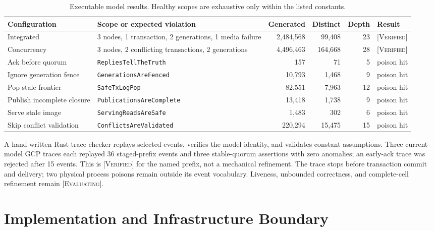 \documentclass[sigconf,nonacm]{acmart}
\newcommand{\verified}{\textsc{[Verified]}}
\newcommand{\evaluating}{\textsc{[Evaluating]}}
\begin{document}
\begin{table}[t]
  \centering
  \small
  \caption{Executable model results. Healthy scopes are exhaustive only within
  the listed constants.}
  \label{tab:tla}
  \begin{tabularx}{\textwidth}{@{}p{}X r r r l@{}}
    \toprule
    Configuration & Scope or expected violation & Generated & Distinct & Depth & Result \\
    \midrule
    Integrated & 3 nodes, 1 transaction, 2 generations, 1 media failure &
    2,484,568 & 99,408 & 23 & \verified \\
    Concurrency & 3 nodes, 2 conflicting transactions, 2 generations &
    4,496,463 & 164,668 & 28 & \verified \\
    Ack before quorum & \texttt{RepliesTellTheTruth} & 157 & 71 & 5 & poison hit \\
    Ignore generation fence & \texttt{GenerationsAreFenced} & 10,793 & 1,468 & 9 & poison hit \\
    Pop stale frontier & \texttt{SafeTxLogPop} & 82,551 & 7,963 & 12 & poison hit \\
    Publish incomplete closure & \texttt{PublicationsAreComplete} & 13,418 & 1,738 & 9 & poison hit \\
    Serve stale image & \texttt{ServingReadsAreSafe} & 1,483 & 302 & 6 & poison hit \\
    Skip conflict validation & \texttt{ConflictsAreValidated} & 220,294 & 15,475 & 15 & poison hit \\
    \bottomrule
  \end{tabularx}
\end{table}

A hand-written Rust trace checker replays selected events, verifies the model
identity, and validates constant assumptions. Three current-model GCP traces
each replayed 36 staged-prefix events and three stable-quorum assertions with
zero anomalies; an early-ack trace was rejected after 15 events. This is
\verified{} for the named prefix, not a mechanical refinement. The trace stops
before transaction commit and delivery; two physical process poisons remain
outside its event vocabulary. Liveness, unbounded correctness, and complete-cell
refinement remain \evaluating{}.

\section{Implementation and Infrastructure Boundary}
\end{document}
